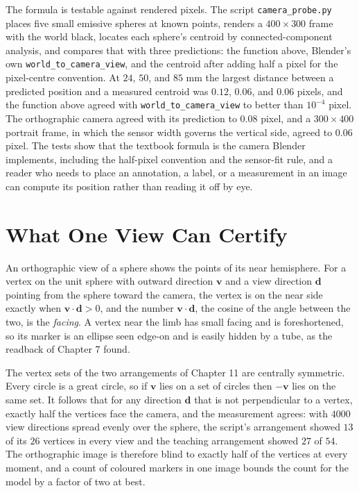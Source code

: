 The formula is testable against rendered pixels. The script \texttt{camera\_probe.py} places five small emissive spheres at known points, renders a $400\times300$ frame with the world black, locates each sphere's centroid by connected-component analysis, and compares that with three predictions: the function above, Blender's own \texttt{world\_to\_camera\_view}, and the centroid after adding half a pixel for the pixel-centre convention. At $24$, $50$, and $85$ mm the largest distance between a predicted position and a measured centroid was $0.12$, $0.06$, and $0.06$ pixels, and the function above agreed with \texttt{world\_to\_camera\_view} to better than $10^{-4}$ pixel. The orthographic camera agreed with its prediction to $0.08$ pixel, and a $300\times400$ portrait frame, in which the sensor width governs the vertical side, agreed to $0.06$ pixel. The tests show that the textbook formula is the camera Blender implements, including the half-pixel convention and the sensor-fit rule, and a reader who needs to place an annotation, a label, or a measurement in an image can compute its position rather than reading it off by eye.

\section{What One View Can Certify}

An orthographic view of a sphere shows the points of its near hemisphere. For a vertex on the unit sphere with outward direction $\mathbf v$ and a view direction $\mathbf d$ pointing from the sphere toward the camera, the vertex is on the near side exactly when $\mathbf v\cdot\mathbf d>0$, and the number $\mathbf v\cdot\mathbf d$, the cosine of the angle between the two, is the \emph{facing}. A vertex near the limb has small facing and is foreshortened, so its marker is an ellipse seen edge-on and is easily hidden by a tube, as the readback of Chapter 7 found.

The vertex sets of the two arrangements of Chapter 11 are centrally symmetric. Every circle is a great circle, so if $\mathbf v$ lies on a set of circles then $-\mathbf v$ lies on the same set. It follows that for any direction $\mathbf d$ that is not perpendicular to a vertex, exactly half the vertices face the camera, and the measurement agrees: with $4000$ view directions spread evenly over the sphere, the script's arrangement showed $13$ of its $26$ vertices in every view and the teaching arrangement showed $27$ of $54$. The orthographic image is therefore blind to exactly half of the vertices at every moment, and a count of coloured markers in one image bounds the count for the model by a factor of two at best.

